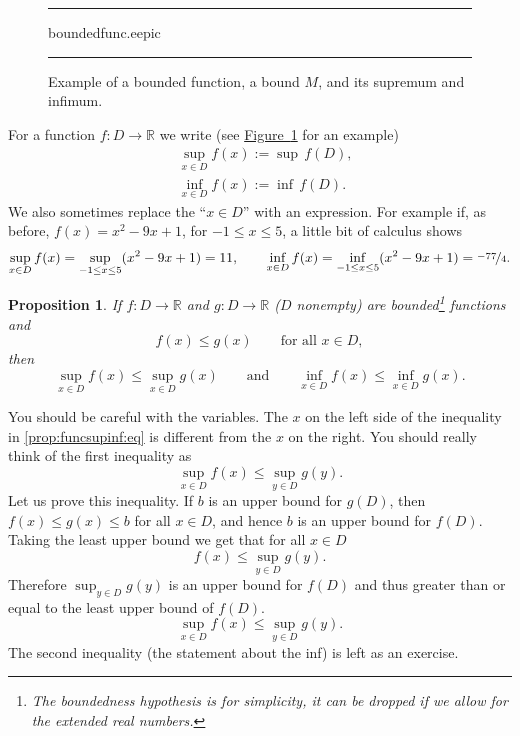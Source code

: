 \documentclass[12pt]{book}
\newenvironment{myfigureht}{%
\begin{figure}[h!t]
\noindent\rule{\textwidth}{0.4pt}\vspace{12pt}\par\centering}%
{\par\noindent\rule{\textwidth}{0.4pt}
\end{figure}}
\newcommand{\R}{{\mathbb{R}}}
\theoremstyle{plain}
\newtheorem{prop}[thm]{Proposition}
\theoremstyle{remark}
\theoremstyle{definition}
\theoremstyle{exercise}
\theoremstyle{example}
\newcommand{\figureref}[1]{\hyperref[#1]{Figure~\ref*{#1}}}
\begin{document}
\begin{myfigureht}
{boundedfunc.eepic}
\caption{Example of a bounded function, a bound $M$, and its supremum and infimum.\label{boundedfuncfig}}
\end{myfigureht}
For a function $f \colon D \to \R$ we write (see \figureref{boundedfuncfig} for
an example)
\begin{align*}
& \sup_{x \in D} f(x) := \sup\, f(D) , \\
& \inf_{x \in D} f(x) := \inf\, f(D) .
\end{align*}
We also sometimes replace the ``$x \in D$'' with an expression.
For example if, as before, $f(x) = x^2-9x+1$, for $-1 \leq x \leq 5$, 
a little bit of calculus shows
\begin{equation*}
\sup_{x \in D} f(x) = 
\sup_{-1 \leq x \leq 5} ( x^2 -9x+1 ) = 11,
\qquad
\inf_{x \in D} f(x) = 
\inf_{-1 \leq x \leq 5} ( x^2 -9x+1 ) = \nicefrac{-77}{4} .
\end{equation*}




\begin{prop} \label{prop:funcsupinf}
If $f \colon D \to \R$ and $g \colon D \to \R$ ($D$ nonempty) are
bounded\footnote{The boundedness hypothesis is for simplicity,
it can be dropped if we allow for the extended real numbers.}
functions and
\begin{equation*}
f(x) \leq g(x) \qquad \text{for all $x \in D$},
\end{equation*}
then
\begin{equation} \label{prop:funcsupinf:eq}
\sup_{x \in D} f(x) \leq \sup_{x \in D} g(x)
\qquad \text{and} \qquad
\inf_{x \in D} f(x) \leq \inf_{x \in D} g(x) .
\end{equation}
\end{prop}

You should be careful with the variables.  The $x$ on the left side of
the inequality in \eqref{prop:funcsupinf:eq}
is different from the $x$ on the right.  You
should really think of the first inequality as
\begin{equation*}
\sup_{x \in D} f(x) \leq \sup_{y \in D} g(y) .
\end{equation*}
Let us prove this inequality.  If $b$ is an upper bound for $g(D)$, then
$f(x) \leq g(x) \leq b$ for all $x \in D$, and hence $b$ is an upper bound for $f(D)$.
Taking the least upper bound we get that for all $x \in D$
\begin{equation*}
f(x) \leq \sup_{y \in D} g(y) .
\end{equation*}
Therefore
$\sup_{y \in D} g(y)$ is an upper bound for $f(D)$ and thus greater than or
equal to the least upper bound of $f(D)$.
\begin{equation*}
\sup_{x \in D} f(x) \leq \sup_{y \in D} g(y) .
\end{equation*}
The second inequality (the statement about the inf) is left as an exercise.
\end{document}
